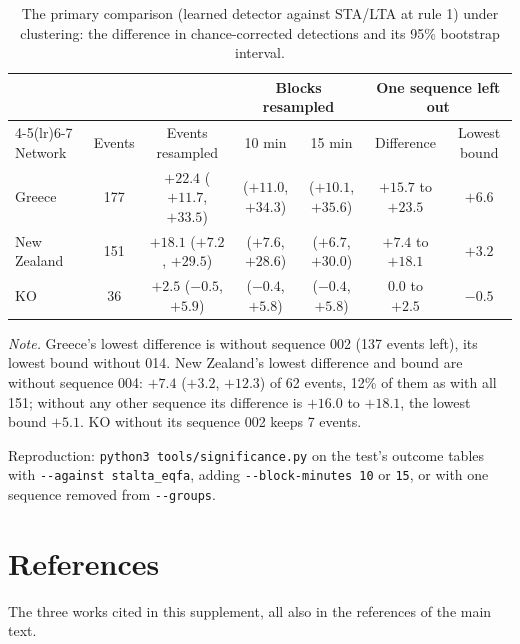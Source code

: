 \documentclass[11pt,a4paper]{article}
\newcommand{\stalta}{STA/LTA}
\newcommand{\tool}[1]{\nolinkurl{#1}}
\newcommand{\tablenote}[1]{\par\vspace{4pt}%
  \begin{minipage}{\linewidth}\footnotesize\textit{Note.} #1
\end{minipage}}
\begin{document}
\begin{table}[htbp]
  \centering\footnotesize
  \caption{The primary comparison (learned detector against \stalta{} at rule 1) under
  clustering: the difference in chance-corrected detections and its 95\% bootstrap
  interval.}\label{t:clustering}
  \setlength{\tabcolsep}{3pt}
  \begin{tabular}{@{}lcccccc@{}}
    \toprule
    & & & \multicolumn{2}{c}{Blocks resampled} & \multicolumn{2}{c}{One sequence left out} \\
    \cmidrule(lr){4-5}\cmidrule(lr){6-7}
    Network & Events & Events resampled & 10 min & 15 min & Difference & Lowest bound \\
    \midrule
    Greece & 177 & $+22.4$ ($+11.7$, $+33.5$) & ($+11.0$, $+34.3$) & ($+10.1$, $+35.6$) & $+15.7$ to $+23.5$ & $+6.6$ \\
    New Zealand & 151 & $+18.1$ ($+7.2$, $+29.5$) & ($+7.6$, $+28.6$) & ($+6.7$, $+30.0$) & $+7.4$ to $+18.1$ & $+3.2$ \\
    KO & 36 & $+2.5$ ($-0.5$, $+5.9$) & ($-0.4$, $+5.8$) & ($-0.4$, $+5.8$) & $0.0$ to $+2.5$ & $-0.5$ \\
    \bottomrule
  \end{tabular}
  \tablenote{Greece's lowest difference is without sequence 002 (137 events left), its
  lowest bound without 014. New Zealand's lowest difference and bound are without
  sequence 004: $+7.4$ ($+3.2$, $+12.3$) of 62 events, 12\% of them as with all 151;
  without any other sequence its difference is $+16.0$ to $+18.1$, the lowest bound
  $+5.1$. KO without its sequence 002 keeps 7 events.}
\end{table}

\noindent Reproduction: \tool{python3 tools/significance.py} on the test's outcome
tables with \tool{--against stalta\_eqfa}, adding \tool{--block-minutes 10} or
\tool{15}, or with one sequence removed from \tool{--groups}.

\clearpage
\section*{References}

The three works cited in this supplement, all also in the references of the main text.
\end{document}
